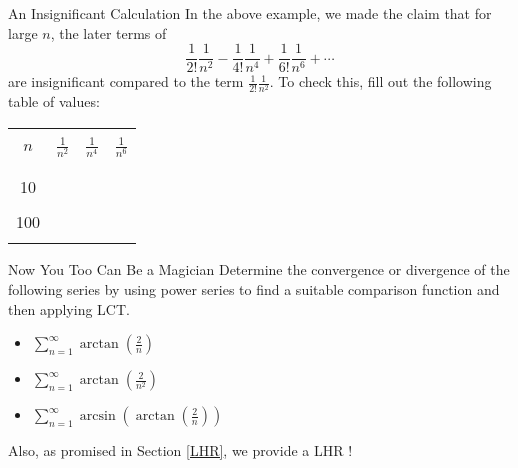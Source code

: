 \begin{exercise}{An Insignificant Calculation \Coffeecup}
In the above example, we made the claim that for large $n$, the later terms of $$ \frac{1}{2!}\frac{1}{n^2}-\frac{1}{4!}\frac{1}{n^4}+\frac{1}{6!}\frac{1}{n^6}+\cdots$$ are insignificant compared to the term $\frac{1}{2!}\frac{1}{n^2}$.  To check this, fill out the following table of values:

\begin{center}
\begin{tabular}{|c|c|c|c|}\hline  & & & \\
$n$ & $\frac{1}{n^2} $ & $ \frac{1}{n^4} $ & $ \frac{1}{n^6}$ \\  
 & & & \\ \hline
 & & & \\
10 & & & \\
 & & & \\
100 & & & \\ 
& & & \\ \hline
\end{tabular}
\end{center}

\end{exercise}
\begin{exercise}{Now You Too Can Be a Magician \Coffeecup \Coffeecup \Coffeecup}
Determine the convergence or divergence of the following series by using power series to find a suitable comparison function and then applying LCT.
\begin{itemize}
\item $ \sum_{n=1}^\infty\arctan\left(\frac{2}{n}\right)$ \vspace*{1in}
\item $ \sum_{n=1}^\infty\arctan\left(\frac{2}{n^2}\right)$ \vspace*{1in}
\item $ \sum_{n=1}^\infty\arcsin\left(\arctan\left(\frac{2}{n}\right)\right)$ \vspace*{1in}
\end{itemize}
\end{exercise}
Also, as promised in Section \ref{LHR}, we provide a LHR !


